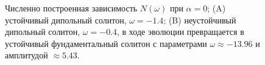 %
\begin{figure}
\caption{Численно построенная зависимость $N(\omega)$ при $\alpha = 0$; (A) устойчивый дипольный солитон, $\omega = -1.4$; (B) неустойчивый дипольный солитон, $\omega = -0.4$, в ходе эволюции превращается в устойчивый фундаментальный солитон с параметрами $\omega \approx -13.96$ и амплитудой $\approx 5.43$.}
\label{pic:summary}
\end{figure}
%
